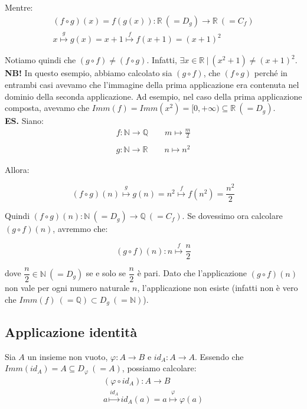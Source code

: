 \documentclass{article}
\begin{document}
\noindent Mentre: 
\begin{gather*}
    (f \circ g)(x) = f(g(x)): \mathbb{R} \ (= D_g)  \xrightarrow{} \mathbb{R} \ (= C_f) \\
    x \overset{g}{\longmapsto} g(x) = x + 1 \overset{f}{\longmapsto} f(x + 1) = (x + 1)^2
\end{gather*}

\noindent Notiamo quindi che $(g \circ f) \neq (f \circ g)$. Infatti, $\exists x \in \mathbb{R} \ | \ (x^2 + 1) \neq (x + 1)^2$.\\

\noindent\textbf{NB!} In questo esempio, abbiamo calcolato sia $(g \circ f)$, che $(f \circ g)$ perché in entrambi casi avevamo che l'immagine della prima applicazione era contenuta nel dominio della seconda applicazione. Ad esempio, nel caso della prima applicazione composta, avevamo che $Imm(f) = Imm(x^2) = [0, +\infty) \subseteq \mathbb{R} \ (= D_g)$.\\

\noindent\textbf{ES.} Siano:
\begin{gather*}
    f: \mathbb{N} \xrightarrow{} \mathbb{Q} \qquad m \longmapsto \frac{m}{2}\\
    \\
    g: \mathbb{N} \xrightarrow{} \mathbb{R} \qquad n \longmapsto n^2
\end{gather*}

\noindent Allora:

\begin{equation*}
    (f \circ g)(n) \overset{g}{\longmapsto} g(n) = n^2 \overset{f}{\longmapsto} f(n^2) = \frac{n^2}{2}
\end{equation*}

\noindent Quindi $(f \circ g)(n): \mathbb{N} \ (= D_g) \xrightarrow{} \mathbb{Q} \ (= C_f)$. Se dovessimo ora calcolare $(g \circ f)(n)$, avremmo che: 

\begin{equation*}
    (g \circ f)(n): n \overset{f}{\longmapsto} \frac{n}{2}
\end{equation*}

\noindent dove $\dfrac{n}{2} \in \mathbb{N} \ (= D_g)$ se e solo se $\dfrac{n}{2}$ è pari. Dato che l'applicazione $(g \circ f)(n)$ non vale per ogni numero naturale $n$, l'applicazione non esiste (infatti non è vero che $Imm(f) \ (= \mathbb{Q}) \subset D_g \ (= \mathbb{N})$).

\subsection{Applicazione identità}
Sia $A$ un insieme non vuoto, $\varphi: A \xrightarrow{} B$ e $id_A: A \xrightarrow{} A$. Essendo che $Imm(id_A) = A \subseteq D_\varphi \ (= A)$, possiamo calcolare:
\begin{gather*}
    (\varphi \circ id_A): A \xrightarrow{} B\\
    a \overset{id_A}{\longmapsto} id_A(a) = a \overset{\varphi}{\longmapsto} \varphi(a)
\end{gather*}
\end{document}
